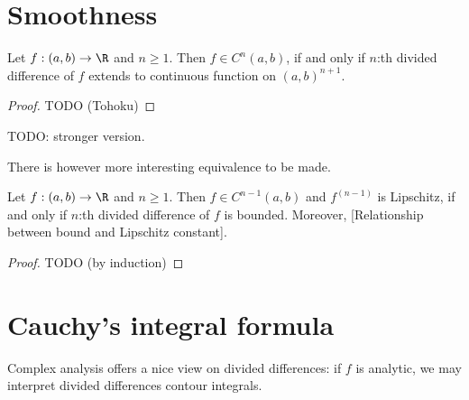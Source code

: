 \section{Smoothness}

\begin{lause}
	Let $f : (a, b) \to \R$ and $n \geq 1$. Then $f \in C^{n}(a, b)$, if and only if $n$:th divided difference of $f$ extends to continuous function on $(a, b)^{n + 1}$.
\end{lause}
\begin{proof}
	TODO (Tohoku)
\end{proof}

TODO: stronger version.

There is however more interesting equivalence to be made.

\begin{lause}\label{bounded_div}
	Let $f : (a, b) \to \R$ and $n \geq 1$. Then $f \in C^{n - 1}(a, b)$ and $f^{(n - 1)}$ is Lipschitz, if and only if $n$:th divided difference of $f$ is bounded. Moreover, [Relationship between bound and Lipschitz constant].
\end{lause}

\begin{proof}
	TODO (by induction)
\end{proof}

\section{Cauchy's integral formula}

Complex analysis offers a nice view on divided differences: if $f$ is analytic, we may interpret divided differences contour integrals.

